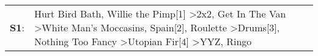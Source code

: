 \begin{supertabular}{p{0.03\textwidth}p{0.92\textwidth}}
 \textbf{S1}:  &  Hurt Bird Bath\textsuperscript{}, \enspace Willie the Pimp[1]\textsuperscript{} \textgreater \enspace 2x2\textsuperscript{}, \enspace Get In The Van\textsuperscript{} \textgreater \enspace White Man's Moccasins\textsuperscript{}, \enspace Spain[2]\textsuperscript{}, \enspace Roulette\textsuperscript{} \textgreater \enspace Drums[3]\textsuperscript{}, \enspace Nothing Too Fancy\textsuperscript{} \textgreater \enspace Utopian Fir[4]\textsuperscript{} \textgreater \enspace YYZ\textsuperscript{}, \enspace Ringo\textsuperscript{}  \enspace  \\
\end{supertabular}
